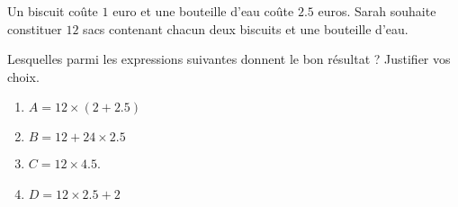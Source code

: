 
\begin{exercice}\label{exosmath-0885}

    Un biscuit coûte \( 1\) euro et une bouteille d'eau coûte \( 2.5\) euros. Sarah souhaite constituer \( 12\) sacs contenant chacun deux biscuits et une bouteille d'eau. 

            Lesquelles parmi les expressions suivantes donnent le bon résultat ? Justifier vos choix.
            \begin{enumerate}
                \item
                    \( A=12\times (   2+2.5 )\)
                \item
                    \( B=12+24\times 2.5\)
                \item
                    \( C=12\times 4.5\).
                \item
                    \( D=12\times 2.5+2\)
            \end{enumerate}

\end{exercice}
